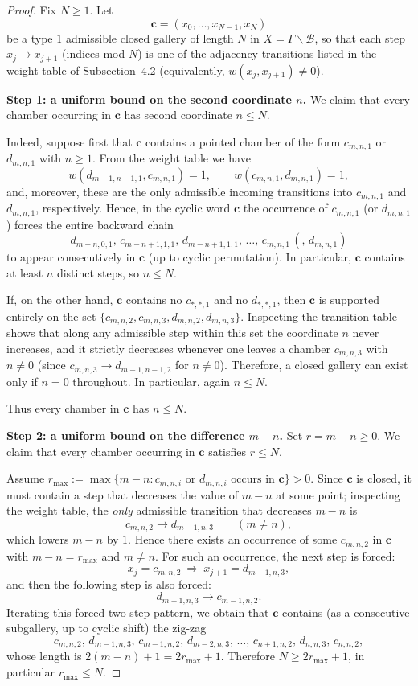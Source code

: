 \documentclass[11pt]{amsart}
\theoremstyle{definition}
\theoremstyle{remark}
\numberwithin{equation}{section}
\begin{document}
\begin{proof}
Fix $N\ge 1$.  Let
\[
\mathbf{c}=(x_0,\dots,x_{N-1},x_N)
\]
be a type $1$ admissible closed gallery of length $N$ in $X=\Gamma\backslash\mathcal B$, so that each step
$x_j\to x_{j+1}$ (indices mod $N$) is one of the adjacency transitions listed in the weight table of
Subsection~4.2 (equivalently, $w(x_j,x_{j+1})\neq 0$).

\medskip
\noindent\textbf{Step 1: a uniform bound on the second coordinate $n$.}
We claim that every chamber occurring in $\mathbf{c}$ has second coordinate $n\le N$.

Indeed, suppose first that $\mathbf{c}$ contains a pointed chamber of the form $c_{m,n,1}$ or $d_{m,n,1}$ with $n\ge 1$.
From the weight table we have
\[
w(d_{m-1,n-1,1},c_{m,n,1})=1,\qquad w(c_{m,n,1},d_{m,n,1})=1,
\]
and, moreover, these are the only admissible incoming transitions into $c_{m,n,1}$ and $d_{m,n,1}$,
respectively.  Hence, in the cyclic word $\mathbf{c}$ the occurrence of $c_{m,n,1}$ (or $d_{m,n,1}$) forces the entire
backward chain
\[
d_{m-n,0,1},\,c_{m-n+1,1,1},\,d_{m-n+1,1,1},\,\dots,\,c_{m,n,1}\,(,\,d_{m,n,1})
\]
to appear consecutively in $\mathbf{c}$ (up to cyclic permutation).  In particular, $\mathbf{c}$ contains at least $n$ distinct steps,
so $n\le N$.

If, on the other hand, $\mathbf{c}$ contains no $c_{\ast,\ast,1}$ and no $d_{\ast,\ast,1}$, then $\mathbf{c}$ is supported entirely on
the set $\{c_{m,n,2},c_{m,n,3},d_{m,n,2},d_{m,n,3}\}$.  Inspecting the transition table shows that along any admissible
step within this set the coordinate $n$ never increases, and it strictly decreases whenever one leaves a chamber
$c_{m,n,3}$ with $n\neq 0$ (since $c_{m,n,3}\to d_{m-1,n-1,2}$ for $n\neq 0$).  Therefore, a closed gallery can exist
only if $n=0$ throughout.  In particular, again $n\le N$.

Thus every chamber in $\mathbf{c}$ has $n\le N$.

\medskip
\noindent\textbf{Step 2: a uniform bound on the difference $m-n$.}
Set $r=m-n\ge 0$.  We claim that every chamber occurring in $\mathbf{c}$ satisfies $r\le N$.

Assume $r_{\max}:=\max\{m-n : c_{m,n,i}\text{ or }d_{m,n,i}\text{ occurs in }\mathbf{c}\}>0$.
Since $\mathbf{c}$ is closed, it must contain a step that decreases the value of $m-n$ at some point; inspecting the weight
table, the \emph{only} admissible transition that decreases $m-n$ is
\[
c_{m,n,2}\longrightarrow d_{m-1,n,3}\qquad(m\neq n),
\]
which lowers $m-n$ by $1$.  Hence there exists an occurrence of some $c_{m,n,2}$ in $\mathbf{c}$ with $m-n=r_{\max}$ and
$m\neq n$.  For such an occurrence, the next step is forced:
\[
x_j=c_{m,n,2}\ \Rightarrow\ x_{j+1}=d_{m-1,n,3},
\]
and then the following step is also forced:
\[
d_{m-1,n,3}\longrightarrow c_{m-1,n,2}.
\]
Iterating this forced two-step pattern, we obtain that $\mathbf{c}$ contains (as a consecutive subgallery, up to cyclic shift)
the zig-zag
\[
c_{m,n,2},\,d_{m-1,n,3},\,c_{m-1,n,2},\,d_{m-2,n,3},\,\dots,\,c_{n+1,n,2},\,d_{n,n,3},\,c_{n,n,2},
\]
whose length is $2(m-n)+1=2r_{\max}+1$.  Therefore $N\ge 2r_{\max}+1$, in particular $r_{\max}\le N$.


\end{proof}
\end{document}
